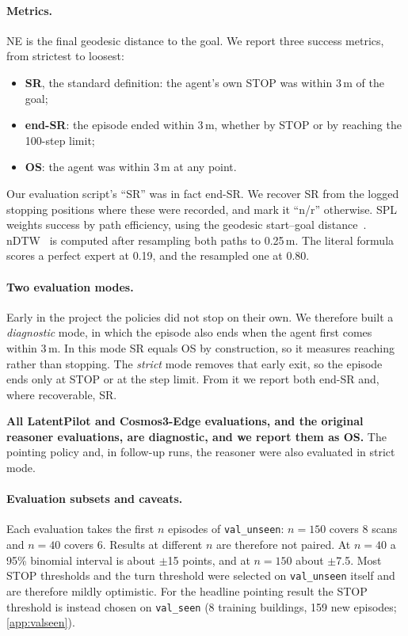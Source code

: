 \documentclass[11pt]{article}
\begin{document}
\paragraph{Metrics.}
NE is the final geodesic distance to the goal. We report three success metrics, from strictest to loosest:
\begin{itemize}
  \item \textbf{SR}, the standard definition: the agent's own STOP was within 3\,m of the goal;
  \item \textbf{end-SR}: the episode ended within 3\,m, whether by STOP or by reaching the 100-step limit;
  \item \textbf{OS}: the agent was within 3\,m at any point.
\end{itemize}
Our evaluation script's ``SR'' was in fact end-SR. We recover SR from the logged stopping positions where these were
recorded, and mark it ``n/r'' otherwise. SPL weights success by path efficiency, using the geodesic start--goal
distance~\citep{anderson2018evaluation}. nDTW~\citep{ilharco2019ndtw} is computed after resampling both paths to
0.25\,m. The literal formula scores a perfect expert at 0.19, and the resampled one at 0.80.

\paragraph{Two evaluation modes.}
Early in the project the policies did not stop on their own. We therefore built a \emph{diagnostic} mode, in which
the episode also ends when the agent first comes within 3\,m. In this mode SR equals OS by construction, so it
measures reaching rather than stopping. The \emph{strict} mode removes that early exit, so the episode ends only
at STOP or at the step limit. From it we report both end-SR and, where recoverable, SR.

\textbf{All LatentPilot and Cosmos3-Edge evaluations, and the original reasoner evaluations, are diagnostic, and we
report them as OS.} The pointing policy and, in follow-up runs, the reasoner were also evaluated in strict mode.

\paragraph{Evaluation subsets and caveats.}
Each evaluation takes the first $n$ episodes of \texttt{val\_unseen}: $n{=}150$ covers 8 scans and $n{=}40$ covers 6.
Results at different $n$ are therefore not paired. At $n{=}40$ a 95\% binomial interval is about $\pm$15 points, and at
$n{=}150$ about $\pm$7.5. Most STOP thresholds and the turn threshold were selected on \texttt{val\_unseen} itself and are
therefore mildly optimistic. For the headline pointing result the STOP threshold is instead chosen on
\texttt{val\_seen} (8 training buildings, 159 new episodes; \cref{app:valseen}).
\end{document}
